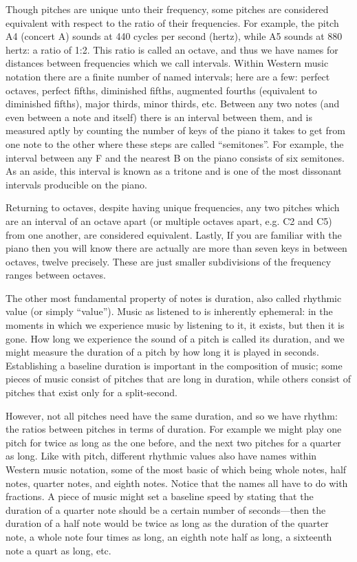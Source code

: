 \documentclass{article}
\begin{document}
Though pitches are unique unto their frequency, some pitches are
considered equivalent with respect to the ratio of their frequencies. For
example, the pitch A4 (concert A) sounds at 440 cycles per second (hertz), while
A5 sounds at 880 hertz: a ratio of 1:2. This ratio is called an octave, and thus
we have names for distances between frequencies which we call intervals. Within
Western music notation there are a finite number of named intervals; here are a
few: perfect octaves, perfect fifths, diminished fifths, augmented fourths
(equivalent to diminished fifths), major thirds, minor thirds, etc. Between any
two notes (and even between a note and itself) there is an interval between
them, and is measured aptly by counting the number of keys of the piano it takes
to get from one note to the other where these steps are called “semitones”. For
example, the interval between any F and the nearest B on the piano consists of
six semitones. As an aside, this interval is known as a tritone and is one of
the most dissonant intervals producible on the piano.

Returning to octaves,
despite having unique frequencies, any two pitches which are an interval of an
octave apart (or multiple octaves apart, e.g. C2 and C5) from one another, are
considered equivalent. Lastly, If you are familiar with the piano then you will
know there are actually are more than seven keys in between octaves, twelve
precisely. These are just smaller subdivisions of the frequency ranges between
octaves.

The other most fundamental property of notes is duration, also called rhythmic
value (or simply “value”). Music as listened to is inherently ephemeral: in the
moments in which we experience music by listening to it, it exists, but then it
is gone. How long we experience the sound of a pitch is called its duration, and
we might measure the duration of a pitch by how long it is played in seconds.
Establishing a baseline duration is important in the composition of music; some
pieces of music consist of pitches that are long in duration, while others
consist of pitches that exist only for a split-second.

However, not all pitches need
have the same duration, and so we have rhythm: the ratios between pitches in
terms of duration. For example we might play one pitch for twice as long as the
one before, and the next two pitches for a quarter as long. Like with pitch,
different rhythmic values also have names within Western music notation, some of
the most basic of which being whole notes, half notes, quarter notes, and
eighth notes. Notice that the names all have to do with fractions. A piece of
music might set a baseline speed by stating that the duration of a quarter note
should be a certain number of seconds—then the duration of a half note would be
twice as long as the duration of the quarter note, a whole note four times as
long, an eighth note half as long, a sixteenth note a quart as long, etc.
\end{document}
